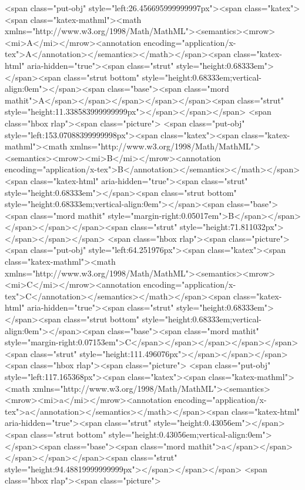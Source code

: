 <span class="put-obj" style="left:26.456695999999997px"><span class="katex"><span class="katex-mathml"><math xmlns="http://www.w3.org/1998/Math/MathML"><semantics><mrow><mi>A</mi></mrow><annotation encoding="application/x-tex">A</annotation></semantics></math></span><span class="katex-html" aria-hidden="true"><span class="strut" style="height:0.68333em"></span><span class="strut bottom" style="height:0.68333em;vertical-align:0em"></span><span class="base"><span class="mord mathit">A</span></span></span></span></span><span class="strut" style="height:11.338583999999999px"></span></span></span> <span class="hbox rlap"><span class="picture">
<span class="put-obj" style="left:153.07088399999998px"><span class="katex"><span class="katex-mathml"><math xmlns="http://www.w3.org/1998/Math/MathML"><semantics><mrow><mi>B</mi></mrow><annotation encoding="application/x-tex">B</annotation></semantics></math></span><span class="katex-html" aria-hidden="true"><span class="strut" style="height:0.68333em"></span><span class="strut bottom" style="height:0.68333em;vertical-align:0em"></span><span class="base"><span class="mord mathit" style="margin-right:0.05017em">B</span></span></span></span></span><span class="strut" style="height:71.811032px"></span></span></span> <span class="hbox rlap"><span class="picture">
<span class="put-obj" style="left:64.251976px"><span class="katex"><span class="katex-mathml"><math xmlns="http://www.w3.org/1998/Math/MathML"><semantics><mrow><mi>C</mi></mrow><annotation encoding="application/x-tex">C</annotation></semantics></math></span><span class="katex-html" aria-hidden="true"><span class="strut" style="height:0.68333em"></span><span class="strut bottom" style="height:0.68333em;vertical-align:0em"></span><span class="base"><span class="mord mathit" style="margin-right:0.07153em">C</span></span></span></span></span><span class="strut" style="height:111.496076px"></span></span></span> <span class="hbox rlap"><span class="picture">
<span class="put-obj" style="left:117.165368px"><span class="katex"><span class="katex-mathml"><math xmlns="http://www.w3.org/1998/Math/MathML"><semantics><mrow><mi>a</mi></mrow><annotation encoding="application/x-tex">a</annotation></semantics></math></span><span class="katex-html" aria-hidden="true"><span class="strut" style="height:0.43056em"></span><span class="strut bottom" style="height:0.43056em;vertical-align:0em"></span><span class="base"><span class="mord mathit">a</span></span></span></span></span><span class="strut" style="height:94.48819999999999px"></span></span></span> <span class="hbox rlap"><span class="picture">
